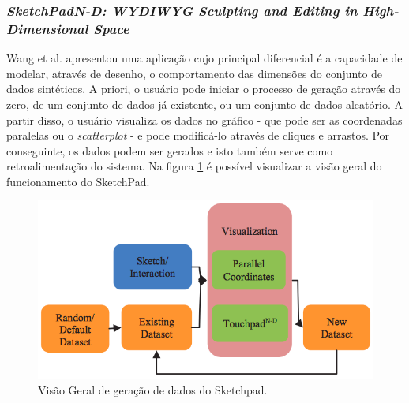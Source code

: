 \documentclass[
	12pt,				%
	openright,			%
	twoside,			%
	a4paper,			%
	english,			%
	brazil				%
	]{abntex2}
\begin{document}
	\subsubsection{\emph{SketchPadN-D: WYDIWYG Sculpting and Editing in High-Dimensional Space}}
	Wang et al. \cite{BingWang2013} apresentou uma aplicação cujo principal diferencial é a capacidade de modelar, através de desenho, o comportamento das dimensões do conjunto de dados sintéticos. A priori, o usuário pode iniciar o processo de geração através do zero, de um conjunto de dados já existente, ou um conjunto de dados aleatório. A partir disso, o usuário visualiza os dados no gráfico - que pode ser as coordenadas paralelas ou o \emph{scatterplot} - e pode modificá-lo através de cliques e arrastos. Por conseguinte, os dados podem ser gerados e isto também serve como retroalimentação do sistema. Na figura \ref{fig:sketchpad} é possível visualizar a visão geral do funcionamento do SketchPad.
	\begin{figure}[h!]
		\centering
		\includegraphics[width=\linewidth]{./figures/TrabalhosRelacionados/Wang11.png}
		\caption{Visão Geral de geração de dados do Sketchpad.}
		\label{fig:sketchpad}
	\end{figure}
\end{document}
